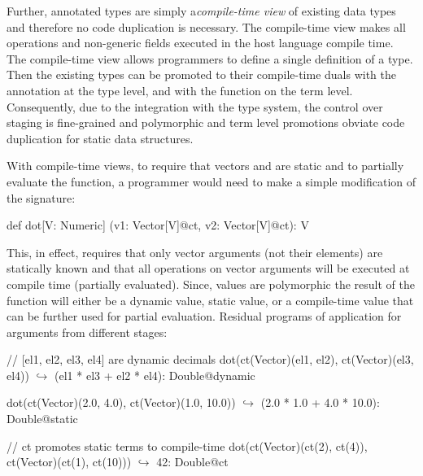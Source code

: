  Further, annotated types are simply a\emph{compile-time
 view} of existing data types and therefore no code duplication is necessary.
 The compile-time view makes all operations and non-generic fields executed in
 the host language compile time. The compile-time view allows programmers to
 define a single definition of a type. Then the existing types can be promoted
 to their compile-time duals with the  annotation at the type level,
 and with the  function on the term level. Consequently, due to the
 integration with the type system, the control over staging is
 fine-grained and polymorphic and term level promotions obviate code duplication
 for static data structures.


With compile-time views, to require that vectors  and  are
 static and to partially evaluate the function, a programmer would need to make
 a simple modification of the  signature:\begin{lstparagraph}
def dot[V: Numeric]
  (v1: Vector[V]@ct, v2: Vector[V]@ct): V
\end{lstparagraph}

This, in effect, requires that only vector arguments (not their elements) are
 statically known and that all operations on vector arguments will be executed
 at compile time (partially evaluated). Since, values are polymorphic the result
 of the function will either be a dynamic value, static value, or a compile-time value
 that can be further used for partial evaluation. Residual programs of 
 application for arguments from different stages:

\vspace{1.8mm}
\begin{listing}[mathescape]
  // [el1, el2, el3, el4] are dynamic decimals
  dot(ct(Vector)(el1, el2), ct(Vector)(el3, el4))
    $\hookrightarrow$ (el1 * el3 + el2 * el4): Double@dynamic

  dot(ct(Vector)(2.0, 4.0), ct(Vector)(1.0, 10.0))
    $\hookrightarrow$ (2.0 * 1.0 + 4.0 * 10.0): Double@static

  // ct promotes static terms to compile-time
  dot(ct(Vector)(ct(2), ct(4)),
      ct(Vector)(ct(1), ct(10)))
    $\hookrightarrow$ 42: Double@ct
\end{listing}
\vspace{1.8mm}

